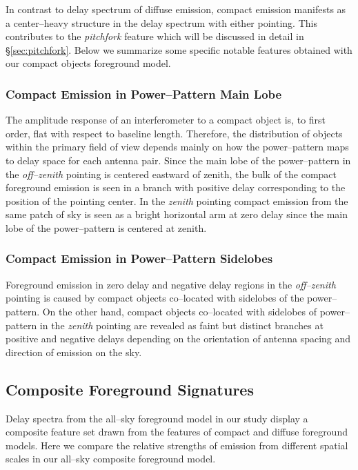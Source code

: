 \documentclass[preprint2,iop,numberedappendix]{emulateapj}
\begin{document}
In contrast to delay spectrum of diffuse emission, compact emission manifests as a center--heavy structure in the delay spectrum with either pointing. This contributes to the {\it pitchfork} feature which will be discussed in detail in \S\ref{sec:pitchfork}. Below we summarize some specific notable features obtained with our compact objects foreground model.

\subsubsection{Compact Emission in Power--Pattern Main Lobe}\label{sec:csm-main-lobe}

The amplitude response of an interferometer to a compact object is, to first order, flat with respect to baseline length. Therefore, the distribution of objects within the primary field of view depends mainly on how the power--pattern maps to delay space for each antenna pair. Since the main lobe of the power--pattern in the {\it off--zenith} pointing is centered eastward of zenith, the bulk of the compact foreground emission is seen in a branch with positive delay corresponding to the position of the pointing center. In the {\it zenith} pointing compact emission from the same patch of sky is seen as a bright horizontal arm at zero delay  since the main lobe of the power--pattern is centered at zenith. 

\subsubsection{Compact Emission in Power--Pattern Sidelobes}\label{sec:csm-side-lobe}

Foreground emission in zero delay and negative delay regions in the {\it off--zenith} pointing is caused by compact objects co--located with sidelobes of the power--pattern. On the other hand, compact objects co--located with sidelobes of power--pattern in the {\it zenith} pointing are revealed as faint but distinct branches at positive and negative delays depending on the orientation of antenna spacing and direction of emission on the sky. 

\subsection{Composite Foreground Signatures}\label{sec:composite}

Delay spectra from the all--sky foreground model in our study display a composite feature set drawn from the features of compact and diffuse foreground models. Here we compare the relative strengths of emission from different spatial scales in our all--sky composite foreground model. 
\end{document}
